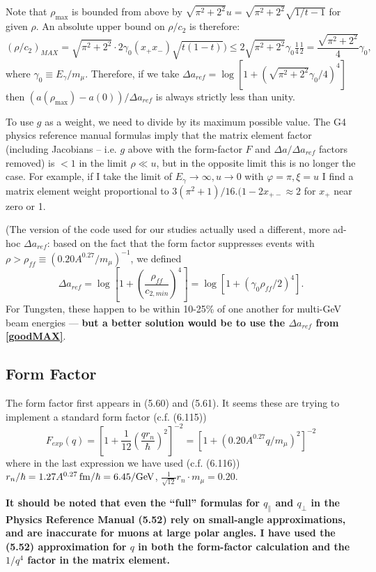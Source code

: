 \documentclass[11pt]{article}
\newcommand{\be}{\begin{equation}}
\newcommand{\ee}{\end{equation}}
\begin{document}
Note that $\rho_{\max}$ is bounded from above by $\sqrt{\pi^2 + 2^2} u = \sqrt{\pi^2 + 2^2} \sqrt{1/t-1}$ for given $\rho$.  An absolute upper bound on $\rho/c_2$ is therefore:
\be
(\rho/c_2)_{MAX} = \sqrt{\pi^2 + 2^2} \cdot 2 \gamma_0 (x_+ x_-) \sqrt{t(1-t)}) \leq  2  \sqrt{\pi^2 + 2^2} \gamma_0 \tfrac{1}{4} \tfrac{1}{2} = \frac{ \sqrt{\pi^2 + 2^2}}{4} \gamma_0,\label{goodMAX}
\ee
where $\gamma_0 \equiv E_\gamma/m_\mu$.  Therefore, if we take $\Delta a_{ref} = \log\left[1+(\sqrt{\pi^2 + 2^2}\gamma_0/4)^4\right]$ then $(a(\rho_{\max})-a(0))/\Delta a_{ref}$ is always strictly less than unity.  

To use $g$ as a weight, we need to divide by its maximum possible value.  
The G4 physics reference manual formulas imply that the matrix element factor (including Jacobians -- i.e. $g$ above with the form-factor $F$ and $\Delta a/\Delta a_{ref}$ factors removed) is $<1$ in the limit $\rho \ll u$, but in the opposite limit this is no longer the case.  For example, if I take the limit of $E_\gamma\rightarrow \infty, u\rightarrow 0$ with $\varphi=\pi, \xi= u$ I find a matrix element weight proportional to $3(\pi^2 + 1)/16. (1-2 x_{+-} \approx 2$ for $x_+$ near zero or 1.

(The version of the code used for our studies actually used a different, more ad-hoc $\Delta a_{ref}$:  based on the fact that the form factor suppresses events with $\rho >\rho_{ff} \equiv (0.20 A^{0.27}/m_\mu)^{-1}$, we defined
\be
\Delta a_{ref} =  \log\left[1+\left(\frac{\rho_{ff}}{c_{2,min}}\right)^4\right] = \log\left[1+\left(\gamma_0 \rho_{ff}/2\right)^4\right].
\ee
For Tungsten, these happen to be within 10-25\% of one another for multi-GeV beam energies --- \textbf{but a better solution would be to use the $\Delta a_{ref}$ from \eqref{goodMAX}}.


\subsection{Form Factor}
The form factor first appears in (5.60) and (5.61).  It seems these are trying to implement a standard form factor (c.f. (6.115))
\be
F_{exp}(q)=\left[1+\frac{1}{12} \left( \frac{q r_n}{\hbar} \right)^2 \right]^{-2} = {\left[ 1 + (0.20 A^{0.27} q/m_\mu)^2 \right]^{-2}}
\label{formFactor}
\ee
where in the last expression we have used (c.f. (6.116)) $ r_n/\hbar = 1.27 A^{0.27} \,\rm{fm}/\hbar = 6.45/GeV$, $\frac{1}{\sqrt{12}} r_n\cdot m_\mu = 0.20$.

  \textbf{It should be noted that even the ``full'' formulas for $q_\parallel$ and $q_\perp$ in the Physics Reference Manual (5.52) rely on small-angle approximations, and are inaccurate for muons at large polar angles.  I have used the (5.52) approximation for $q$ in both the form-factor calculation and the $1/q^4$ factor in the matrix element.}
\end{document}

